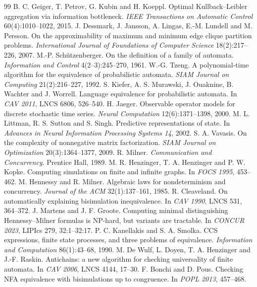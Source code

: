 \documentclass[11pt]{article}
\theoremstyle{definition}
\theoremstyle{plain}
\begin{document}
\begin{thebibliography}{99}
 B. C. Geiger, T. Petrov, G. Kubin and H. Koeppl. Optimal Kullback--Leibler aggregation via information bottleneck. \emph{IEEE Transactions on Automatic Control} 60(4):1010--1022, 2015.
 J. Dessmark, J. Jansson, A. Lingas, E.-M. Lundell and M. Persson. On the approximability of maximum and minimum edge clique partition problems. \emph{International Journal of Foundations of Computer Science} 18(2):217--226, 2007.
 M.-P. Sch\"utzenberger. On the definition of a family of automata. \emph{Information and Control} 4(2--3):245--270, 1961.
 W.-G. Tzeng. A polynomial-time algorithm for the equivalence of probabilistic automata. \emph{SIAM Journal on Computing} 21(2):216--227, 1992.
 S. Kiefer, A. S. Murawski, J. Ouaknine, B. Wachter and J. Worrell. Language equivalence for probabilistic automata. In \emph{CAV 2011}, LNCS 6806, 526--540.
 H. Jaeger. Observable operator models for discrete stochastic time series. \emph{Neural Computation} 12(6):1371--1398, 2000.
 M. L. Littman, R. S. Sutton and S. Singh. Predictive representations of state. In \emph{Advances in Neural Information Processing Systems 14}, 2002.
 S. A. Vavasis. On the complexity of nonnegative matrix factorization. \emph{SIAM Journal on Optimization} 20(3):1364--1377, 2009.
 R. Milner. \emph{Communication and Concurrency}. Prentice Hall, 1989.
 M. R. Henzinger, T. A. Henzinger and P. W. Kopke. Computing simulations on finite and infinite graphs. In \emph{FOCS 1995}, 453--462.
 M. Hennessy and R. Milner. Algebraic laws for nondeterminism and concurrency. \emph{Journal of the ACM} 32(1):137--161, 1985.
 R. Cleaveland. On automatically explaining bisimulation inequivalence. In \emph{CAV 1990}, LNCS 531, 364--372.
 J. Martens and J. F. Groote. Computing minimal distinguishing Hennessy--Milner formulas is NP-hard, but variants are tractable. In \emph{CONCUR 2023}, LIPIcs 279, 32:1--32:17.
 P. C. Kanellakis and S. A. Smolka. CCS expressions, finite state processes, and three problems of equivalence. \emph{Information and Computation} 86(1):43--68, 1990.
 M. De Wulf, L. Doyen, T. A. Henzinger and J.-F. Raskin. Antichains: a new algorithm for checking universality of finite automata. In \emph{CAV 2006}, LNCS 4144, 17--30.
 F. Bonchi and D. Pous. Checking NFA equivalence with bisimulations up to congruence. In \emph{POPL 2013}, 457--468.

\end{thebibliography}
\end{document}
